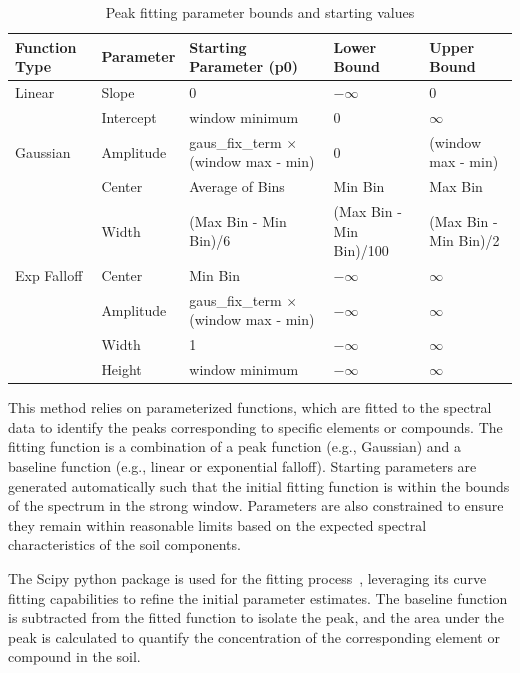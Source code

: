 \documentclass[review]{elsarticle}
\begin{document}
\begin{table}[H]
\centering
\caption{Peak fitting parameter bounds and starting values}
\label{tab:peak_param_bounds}
\begin{tabular}{@{}lllll@{}}
\toprule
Function Type & Parameter & Starting Parameter (p0) & Lower Bound & Upper Bound \\
\midrule
Linear & Slope & 0 & $-\infty$ & 0 \\
 & Intercept & window minimum & 0 & $\infty$ \\
Gaussian & Amplitude & gaus\_fix\_term $\times$ (window max - min) & 0 & (window max - min) \\
 & Center & Average of Bins & Min Bin & Max Bin \\
 & Width & (Max Bin - Min Bin)/6 & (Max Bin - Min Bin)/100 & (Max Bin - Min Bin)/2 \\
Exp Falloff & Center & Min Bin & $-\infty$ & $\infty$ \\
 & Amplitude & gaus\_fix\_term $\times$ (window max - min) & $-\infty$ & $\infty$ \\
 & Width & 1 & $-\infty$ & $\infty$ \\
 & Height & window minimum & $-\infty$ & $\infty$ \\
\bottomrule
\end{tabular}
\end{table}

This method relies on parameterized functions, which are fitted to the spectral data to identify the peaks corresponding to specific elements or compounds. The fitting function is a combination of a peak function (e.g., Gaussian) and a baseline function (e.g., linear or exponential falloff). Starting parameters are generated automatically such that the initial fitting function is within the bounds of the spectrum in the strong window. Parameters are also constrained to ensure they remain within reasonable limits based on the expected spectral characteristics of the soil components.

The Scipy python package is used for the fitting process~\cite{virtanen_scipy_2020}, leveraging its curve fitting capabilities to refine the initial parameter estimates. The baseline function is subtracted from the fitted function to isolate the peak, and the area under the peak is calculated to quantify the concentration of the corresponding element or compound in the soil.
\end{document}
